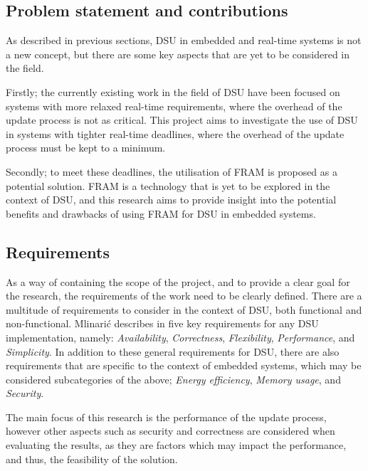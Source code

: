\subsection{Problem statement and contributions}
As described in previous sections, DSU in embedded and real-time systems is not a new concept, but there are some key aspects that are yet to be considered in the field. 

Firstly; the currently existing work in the field of DSU have been focused on systems with more relaxed real-time requirements, where the overhead of the update process is not as critical. This project aims to investigate the use of DSU in systems with tighter real-time deadlines, where the overhead of the update process must be kept to a minimum.

Secondly; to meet these deadlines, the utilisation of FRAM is proposed as a potential solution. FRAM is a technology that is yet to be explored in the context of DSU, and this research aims to provide insight into the potential benefits and drawbacks of using FRAM for DSU in embedded systems.

\subsection{Requirements}
As a way of containing the scope of the project, and to provide a clear goal for the research, the requirements of the work need to be clearly defined. There are a multitude of requirements to consider in the context of DSU, both functional and non-functional. Mlinarić describes in \cite{dsuChallenges} five key requirements for any DSU implementation, namely: \textit{Availability}, \textit{Correctness}, \textit{Flexibility}, \textit{Performance}, and \textit{Simplicity}. In addition to these general requirements for DSU, there are also requirements that are specific to the context of embedded systems, which may be considered subcategories of the above; \textit{Energy efficiency}, \textit{Memory usage}, and \textit{Security}.

The main focus of this research is the performance of the update process, however other aspects such as security and correctness are considered when evaluating the results, as they are factors which may impact the performance, and thus, the feasibility of the solution.
